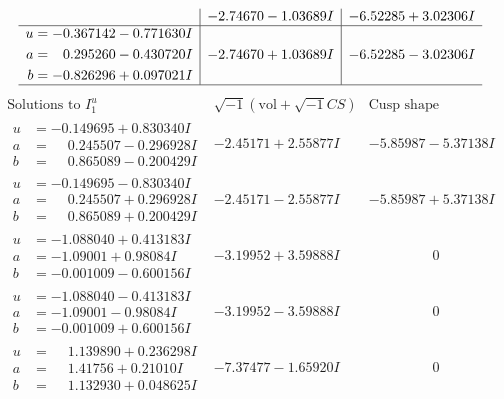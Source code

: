 \documentclass[1p]{elsarticle_modified}
\theoremstyle{definition}
\newcommand{\I}{\sqrt{-1}}
\begin{document}
$$\begin{array}{c|c|c}
 & -2.74670 - 1.03689 I & -6.52285 + 3.02306 I \\ \hline\begin{aligned}
u &= -0.367142 - 0.771630 I \\
a &= \phantom{-}0.295260 - 0.430720 I \\
b &= -0.826296 + 0.097021 I\end{aligned}
 & -2.74670 + 1.03689 I & -6.52285 - 3.02306 I\\
 \hline 
 \end{array}$$\newpage$$\begin{array}{c|c|c}  
\text{Solutions to }I^u_{1}& \I (\text{vol} + \sqrt{-1}CS) & \text{Cusp shape}\\
 \hline 
\begin{aligned}
u &= -0.149695 + 0.830340 I \\
a &= \phantom{-}0.245507 - 0.296928 I \\
b &= \phantom{-}0.865089 - 0.200429 I\end{aligned}
 & -2.45171 + 2.55877 I & -5.85987 - 5.37138 I \\ \hline\begin{aligned}
u &= -0.149695 - 0.830340 I \\
a &= \phantom{-}0.245507 + 0.296928 I \\
b &= \phantom{-}0.865089 + 0.200429 I\end{aligned}
 & -2.45171 - 2.55877 I & -5.85987 + 5.37138 I \\ \hline\begin{aligned}
u &= -1.088040 + 0.413183 I \\
a &= -1.09001 + 0.98084 I \\
b &= -0.001009 - 0.600156 I\end{aligned}
 & -3.19952 + 3.59888 I & \phantom{-0.000000 } 0 \\ \hline\begin{aligned}
u &= -1.088040 - 0.413183 I \\
a &= -1.09001 - 0.98084 I \\
b &= -0.001009 + 0.600156 I\end{aligned}
 & -3.19952 - 3.59888 I & \phantom{-0.000000 } 0 \\ \hline\begin{aligned}
u &= \phantom{-}1.139890 + 0.236298 I \\
a &= \phantom{-}1.41756 + 0.21010 I \\
b &= \phantom{-}1.132930 + 0.048625 I\end{aligned}
 & -7.37477 - 1.65920 I & \phantom{-0.000000 } 0 \\ \hline\begin{aligned}

\end{aligned}
\end{array}$$
\end{document}

